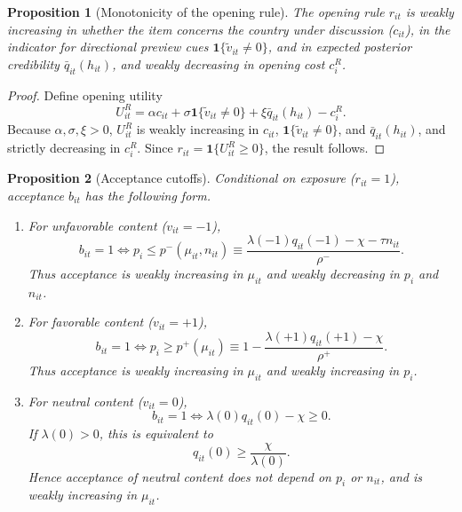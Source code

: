 \documentclass[12pt,american]{article}
\newtheorem{proposition}{Proposition}
\begin{document}
\begin{refsection}
		\begin{proposition}[Monotonicity of the opening rule]
			\label{prop:opening_monotonicity_revised}
			The opening rule \(r_{it}\) is weakly increasing in whether the item concerns the country under discussion (\(c_{it}\)), in the indicator for directional preview cues \(\mathbf{1}\{\tilde v_{it}\neq 0\}\), and in expected posterior credibility \(\bar q_{it}(h_{it})\), and weakly decreasing in opening cost \(c_i^R\).
		\end{proposition}
		
		\begin{proof}
			Define opening utility
			\[
			U_{it}^{R}=\alpha c_{it}+\sigma \mathbf{1}\{\tilde v_{it}\neq 0\}+\xi \bar q_{it}(h_{it})-c_i^R.
			\]
			Because \(\alpha,\sigma,\xi>0\), \(U_{it}^{R}\) is weakly increasing in \(c_{it}\), \(\mathbf{1}\{\tilde v_{it}\neq 0\}\), and \(\bar q_{it}(h_{it})\), and strictly decreasing in \(c_i^R\). Since \(r_{it}=\mathbf{1}\{U_{it}^{R}\ge 0\}\), the result follows.
		\end{proof}
		
		\begin{proposition}[Acceptance cutoffs]
			\label{prop:acceptance_cutoffs_revised}
			Conditional on exposure (\(r_{it}=1\)), acceptance \(b_{it}\) has the following form.
			
			\begin{enumerate}
				\item For unfavorable content (\(v_{it}=-1\)),
				\[
				b_{it}=1
				\iff
				p_i\le p^{-}(\mu_{it},n_{it})
				\equiv
				\frac{\lambda(-1)q_{it}(-1)-\chi-\tau n_{it}}{\rho^-}.
				\]
				Thus acceptance is weakly increasing in \(\mu_{it}\) and weakly decreasing in \(p_i\) and \(n_{it}\).
				
				\item For favorable content (\(v_{it}=+1\)),
				\[
				b_{it}=1
				\iff
				p_i\ge p^{+}(\mu_{it})
				\equiv
				1-\frac{\lambda(+1)q_{it}(+1)-\chi}{\rho^+}.
				\]
				Thus acceptance is weakly increasing in \(\mu_{it}\) and weakly increasing in \(p_i\).
				
				\item For neutral content (\(v_{it}=0\)),
				\[
				b_{it}=1
				\iff
				\lambda(0)q_{it}(0)-\chi\ge 0.
				\]
				If \(\lambda(0)>0\), this is equivalent to
				\[
				q_{it}(0)\ge \frac{\chi}{\lambda(0)}.
				\]
				Hence acceptance of neutral content does not depend on \(p_i\) or \(n_{it}\), and is weakly increasing in \(\mu_{it}\).
			\end{enumerate}
			

\end{proposition}
\end{refsection}
\end{document}
